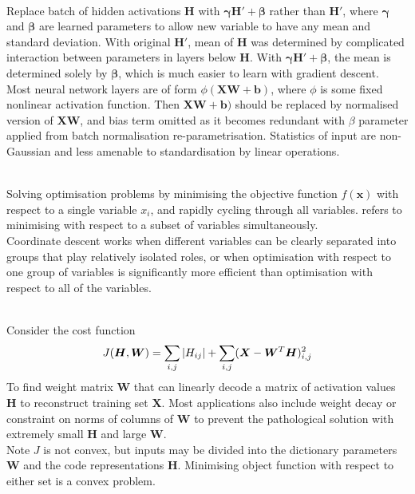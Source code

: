\begin{remark} \\
Replace batch of hidden activations $\bm{H}$ with $\bm{\gamma} \bm{H}' + \bm{\beta}$ rather than $\bm{H}'$, where $\bm{\gamma}$ and $\bm{\beta}$ are learned parameters to allow new variable to have any mean and standard deviation. With original $\bm{H}'$, mean of $\bm{H}$ was determined by complicated interaction between parameters in layers below $\bm{H}$. With $\bm{\gamma} \bm{H}' + \bm{\beta}$, the mean is determined solely by $\bm{\beta}$, which is much easier to learn with gradient descent.\\
Most neural network layers are of form $\phi(\bm{X} \bm{W} + \bm{b})$, where $\phi$ is some fixed nonlinear activation function. Then $\bm{X} \bm{W} + \bm{b})$ should be replaced by normalised version of $\bm{X} \bm{W}$, and bias term omitted as it becomes redundant with $\beta$ parameter applied from batch normalisation re-parametrisation. Statistics of input are non-Gaussian and less amenable to standardisation by linear operations.	
\end{remark}

\begin{remark} \\
Solving optimisation problems by minimising the objective function $f(\bm{x})$ with respect to a single variable $x_i$, and rapidly cycling through all variables.  refers to minimising with respect to a subset of variables simultaneously.\\
 Coordinate descent works when different variables can be clearly separated into groups that play relatively isolated roles, or when optimisation with respect to one group of variables is significantly more efficient than optimisation with respect to all of the variables.
\end{remark}

\begin{example} \\
Consider the cost function
\begin{align}
J(\bm{H}, \bm{W}) = \sum\limits_{i,j} \left\lvert H_{ij}\right\rvert + \sum\limits_{i,j} (\bm{X} - \bm{W}^T \bm{H})^2_{i,j} \nonumber
\end{align}
To find weight matrix $\bm{W}$ that can linearly decode a matrix of activation values $\bm{H}$ to reconstruct training set $\bm{X}$. Most applications also include weight decay or constraint on norms of columns of $\bm{W}$ to prevent the pathological solution with extremely small $\bm{H}$ and large $\bm{W}$.\\
Note $J$ is not convex, but inputs may be divided into the dictionary parameters $\bm{W}$ and the code representations $\bm{H}$. Minimising object function with respect to either set is a convex problem.
\end{example}

